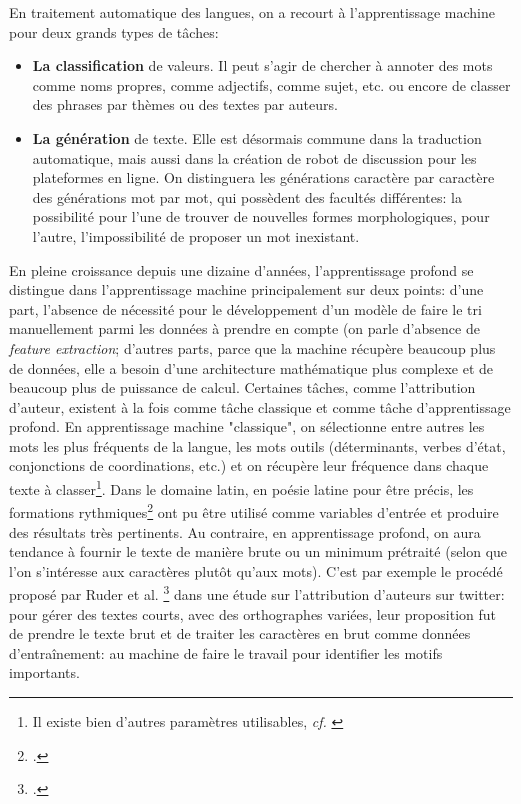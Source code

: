 En traitement automatique des langues, on a recourt à l'apprentissage machine pour deux grands types de tâches:
\begin{itemize}
    \item \textbf{La classification} de valeurs. Il peut s'agir de chercher à annoter des mots comme noms propres, comme adjectifs, comme sujet, etc. ou encore de classer des phrases par thèmes ou des textes par auteurs.
    \item \textbf{La génération} de texte. Elle est désormais commune dans la traduction automatique, mais aussi dans la création de robot de discussion pour les plateformes en ligne. On distinguera les générations caractère par caractère des générations mot par mot, qui possèdent des facultés différentes: la possibilité pour l'une de trouver de nouvelles formes morphologiques, pour l'autre, l'impossibilité de proposer un mot inexistant.
\end{itemize}{}

En pleine croissance depuis une dizaine d'années, l'apprentissage profond se distingue dans l'apprentissage machine principalement sur deux points: d'une part, l'absence de nécessité pour le développement d'un modèle de faire le tri manuellement parmi les données à prendre en compte (on parle d'absence de \textit{feature extraction}; d'autres parts, parce que la machine récupère beaucoup plus de données, elle a besoin d'une architecture mathématique plus complexe et de beaucoup plus de puissance de calcul. Certaines tâches, comme l'attribution d'auteur, existent à la fois comme tâche classique et comme tâche d'apprentissage profond. En apprentissage machine "classique", on sélectionne entre autres les mots les plus fréquents de la langue, les mots outils (déterminants, verbes d'état, conjonctions de coordinations, etc.) et on récupère leur fréquence dans chaque texte à classer\footnote{Il existe bien d'autres paramètres utilisables, \textit{cf.} \cite{Cafieroeaax5489}}. Dans le domaine latin, en poésie latine pour être précis, les formations rythmiques\footcite{nagy_metre_nodate} ont pu être utilisé comme variables d'entrée et produire des résultats très pertinents. Au contraire, en apprentissage profond, on aura tendance à fournir le texte de manière brute ou un minimum prétraité (selon que l'on s'intéresse aux caractères plutôt qu'aux mots). C'est par exemple le procédé proposé par Ruder et al. \footcite{ruder_character-level_2016} dans une étude sur l'attribution d'auteurs sur twitter: pour gérer des textes courts, avec des orthographes variées, leur proposition fut de prendre le texte brut et de traiter les caractères en brut comme données d'entraînement: au machine de faire le travail pour identifier les motifs importants.

